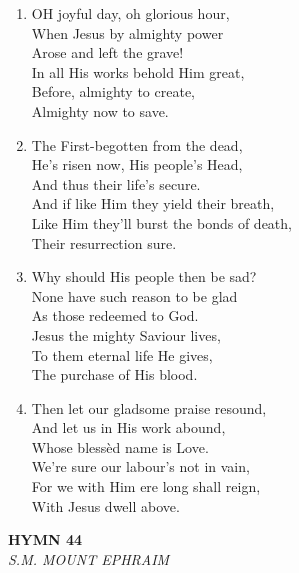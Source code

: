 \documentclass[11pt,a4paper]{article}
\begin{document}
\begin{enumerate}
    \item OH joyful day, oh glorious hour, \\
        When Jesus by almighty power \\
        Arose and left the grave! \\
        In all His works behold Him great, \\
        Before, almighty to create, \\
        Almighty now to save.

    \item The First-begotten from the dead, \\
        He's risen now, His people's Head, \\
        And thus their life's secure. \\
        And if like Him they yield their breath, \\
        Like Him they'll burst the bonds of death, \\
        Their resurrection sure.

    \item Why should His people then be sad? \\
        None have such reason to be glad \\
        As those redeemed to God. \\
        Jesus the mighty Saviour lives, \\
        To them eternal life He gives, \\
        The purchase of His blood.

    \item Then let our gladsome praise resound, \\
        And let us in His work abound, \\
        Whose bless\`ed name is Love. \\
        We're sure our labour's not in vain, \\
        For we with Him ere long shall reign, \\
        With Jesus dwell above.

\end{enumerate}

\newpage
\begin{center}
    {\Large \textbf{HYMN 44}}
    \\
    \textit{S.M. MOUNT EPHRAIM}
\end{center}
\vspace{1em}
\end{document}
